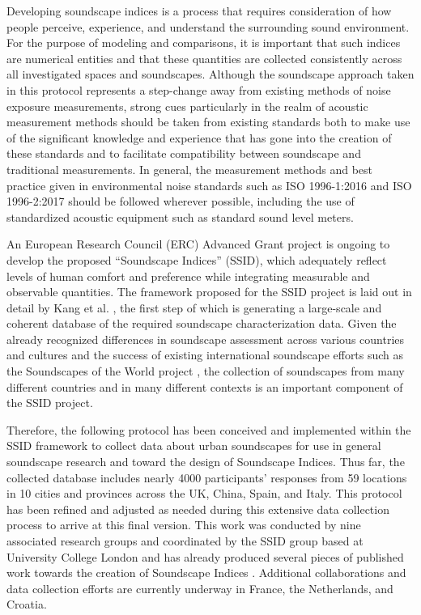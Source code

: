    Developing soundscape indices is a process that requires consideration of how people perceive, experience, and understand the surrounding sound environment. For the purpose of modeling and comparisons, it is important that such indices are numerical entities and that these quantities are collected consistently across all investigated spaces and soundscapes. Although the soundscape approach taken in this protocol represents a step-change away from existing methods of noise exposure measurements, strong cues particularly in the realm of acoustic measurement methods should be taken from existing standards both to make use of the significant knowledge and experience that has gone into the creation of these standards and to facilitate compatibility between soundscape and traditional measurements. In general, the measurement methods and best practice given in environmental noise standards such as ISO 1996-1:2016 and ISO 1996-2:2017 should be followed wherever possible, including the use of standardized acoustic equipment such as standard sound level meters. %

   An European Research Council (ERC) Advanced Grant project is ongoing to develop the proposed ``Soundscape Indices'' (SSID), which adequately reflect levels of human comfort and preference while integrating measurable and observable quantities. The framework proposed for the SSID project is laid out in detail by Kang et al. \citep{Kang2019Towards}, the first step of which is generating a large-scale and coherent database of the required soundscape characterization data. Given the already recognized differences in soundscape assessment across various countries and cultures \citep{Ren2018Soundscape,Kang2016Ten} and the success of existing international soundscape efforts such as the Soundscapes of the World project \citep{DeCoensel2017Urban}, the collection of soundscapes from many different countries and in many different contexts is an important component of the SSID project.

   Therefore, the following protocol has been conceived and implemented within the SSID framework to collect data about urban soundscapes for use in general soundscape research and toward the design of Soundscape Indices. Thus far, the collected database includes nearly 4000 participants' responses from 59 locations in 10 cities and provinces across the UK, China, Spain, and Italy. This protocol has been refined and adjusted as needed during this extensive data collection process to arrive at this final version. This work was conducted by nine associated research groups and coordinated by the SSID group based at University College London and has already produced several pieces of published work towards the creation of Soundscape Indices \citep{Aletta2018Towards,Aletta2019Exploring,Mitchell2019spectral,Mitchell2019Making,Aletta2019Associations,Lionello2019dimension,Aletta2019Exploring,Oberman2018Towards}. Additional collaborations and data collection efforts are currently underway in France, the Netherlands, and Croatia.

